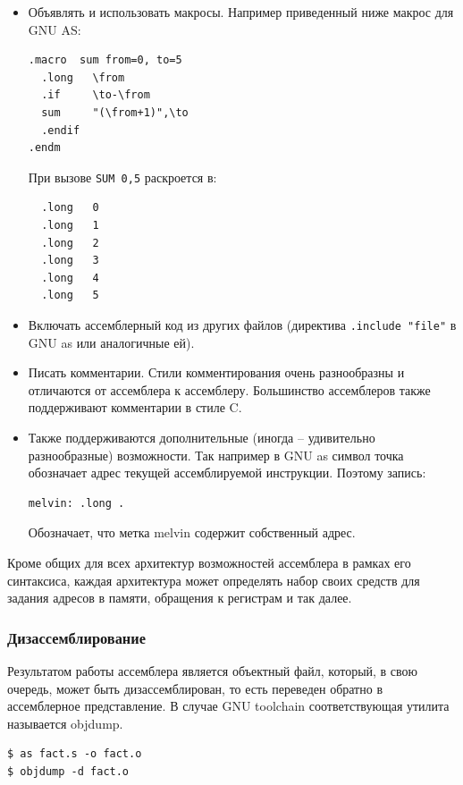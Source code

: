\documentclass[a4paper,12pt,oneside]{article}
\begin{document}
\begin{itemize}
\item Объявлять и использовать макросы. Например приведенный ниже макрос для GNU AS:

\begin{verbatim}
.macro  sum from=0, to=5
  .long   \from
  .if     \to-\from
  sum     "(\from+1)",\to
  .endif
.endm
\end{verbatim}

При вызове \lstinline!SUM 0,5! раскроется в:
 
\begin{verbatim}
  .long   0
  .long   1
  .long   2
  .long   3
  .long   4
  .long   5
\end{verbatim}

\item Включать ассемблерный код из других файлов (директива \lstinline!.include "file"! в GNU as или аналогичные ей).
\item Писать комментарии. Стили комментирования очень разнообразны и отличаются от ассемблера к ассемблеру. Большинство ассемблеров также поддерживают комментарии в стиле C.
\item Также поддерживаются дополнительные (иногда -- удивительно разнообразные) возможности. Так например в GNU as символ точка обозначает адрес текущей ассемблируемой инструкции. Поэтому запись:

\begin{verbatim}
melvin: .long .
\end{verbatim}

Обозначает, что метка melvin содержит собственный адрес.
\end{itemize}

Кроме общих для всех архитектур возможностей ассемблера в рамках его синтаксиса, каждая архитектура может определять набор своих средств для задания адресов в памяти, обращения к регистрам и так далее.

\subsubsection{Дизассемблирование}

Результатом работы ассемблера является объектный файл, который, в свою очередь, может быть дизассемблирован, то есть переведен обратно в ассемблерное представление. В случае GNU toolchain соответствующая утилита называется objdump. 

\begin{verbatim}
$ as fact.s -o fact.o
$ objdump -d fact.o
\end{verbatim}
\end{document}
